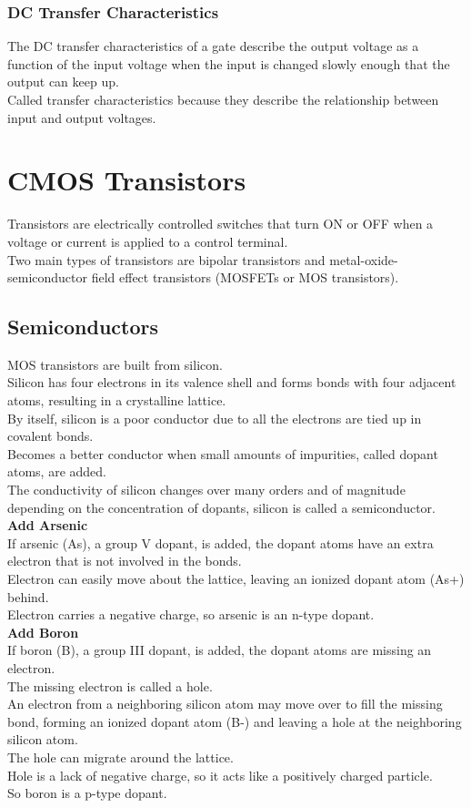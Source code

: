 \documentclass[12pt]{article}
\theoremstyle{definition}
\begin{document}
  \subsubsection{DC Transfer Characteristics}
  The DC transfer characteristics of a gate describe the output voltage as a function of the input voltage when the input is changed slowly enough that the output can keep up. \\
  Called transfer characteristics because they describe the relationship between input and output voltages.

  \section{CMOS Transistors}
  Transistors are electrically controlled switches that turn ON or OFF when a voltage or current is applied to a control terminal. \\
  Two main types of transistors are bipolar transistors and metal-oxide-semiconductor field effect transistors (MOSFETs or MOS transistors).

  \subsection{Semiconductors}
  MOS transistors are built from silicon. \\
  Silicon has four electrons in its valence shell and forms bonds with four adjacent atoms, resulting in a crystalline lattice. \\
  By itself, silicon is a poor conductor due to all the electrons are tied up in covalent bonds. \\
  Becomes a better conductor when small amounts of impurities, called dopant atoms, are added. \\
  The conductivity of silicon changes over many orders and of magnitude depending on the concentration of dopants, silicon is called a semiconductor. \\
  \textbf{Add Arsenic} \\
  If arsenic (As), a group V dopant, is added, the dopant atoms have an extra electron that is not involved in the bonds. \\
  Electron can easily move about the lattice, leaving an ionized dopant atom (As+) behind. \\
  Electron carries a negative charge, so arsenic is an n-type dopant. \\
  \textbf{Add Boron} \\
  If boron (B), a group III dopant, is added, the dopant atoms are missing an electron. \\
  The missing electron is called a hole. \\
  An electron from a neighboring silicon atom may move over to fill the missing bond, forming an ionized dopant atom (B-) and leaving a hole at the neighboring silicon atom. \\
  The hole can migrate around the lattice. \\
  Hole is a lack of negative charge, so it acts like a positively charged particle. \\
  So boron is a p-type dopant.
\end{document}

